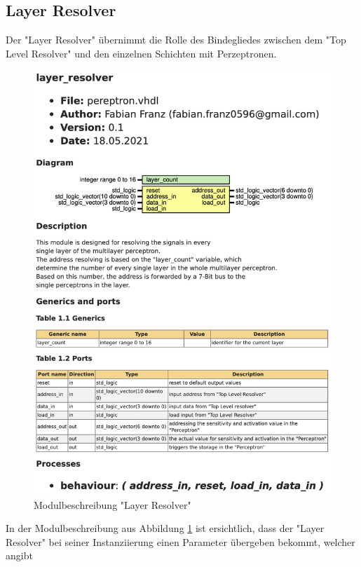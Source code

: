 \documentclass{article}
\numberwithin{equation}{section}
\begin{document}
\subsection{Layer Resolver}
Der "Layer Resolver" übernimmt die Rolle des Bindegliedes zwischen dem "Top Level Resolver"
und den einzelnen Schichten mit Perzeptronen.
\begin{figure}[htb!]
    \begin{center}
      \includegraphics[width=13.25cm]{ModuleDescription/layer_resolver.png}
    \end{center}
    \caption{Modulbeschreibung "Layer Resolver"} \label{fig:layer_resolver}
  \end{figure}
\FloatBarrier
In der Modulbeschreibung aus Abbildung \ref{fig:layer_resolver} ist ersichtlich, dass der 
"Layer Resolver" bei seiner Instanziierung einen Parameter übergeben bekommt, welcher angibt 
\end{document}

